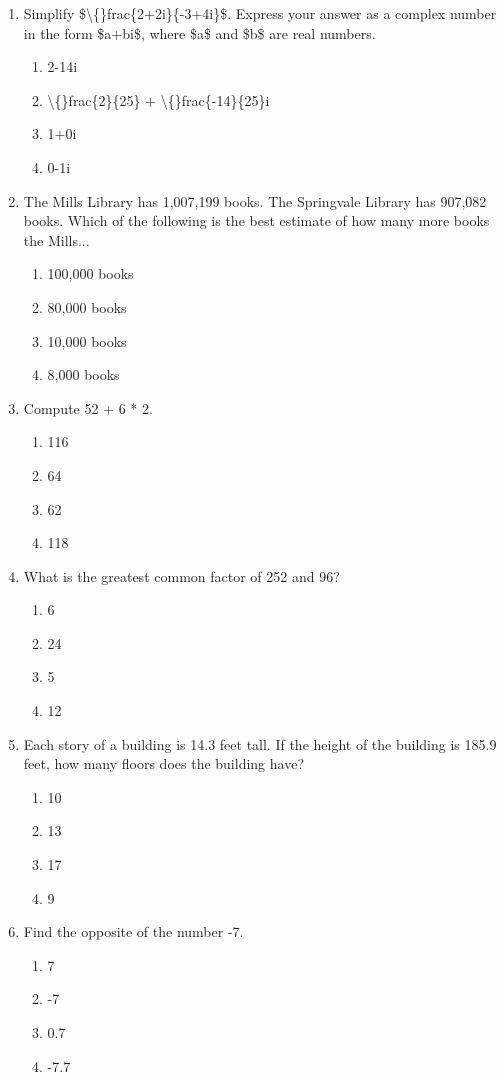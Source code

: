 \documentclass[12pt]{article}
\begin{document}
\begin{enumerate}[label=\arabic*.]
\begin{enumerate}[label=(\alph*)]
    \item 9 bottles of juice for \$20.25
    \item 16 bottles of juice for \$35.68
\end{enumerate}
\item Simplify \$\textbackslash\{\}frac\{2+2i\}\{-3+4i\}\$. Express your answer as a complex number in the form \$a+bi\$, where \$a\$ and \$b\$ are real numbers.
\begin{enumerate}[label=(\alph*)]
    \item 2-14i
    \item \textbackslash\{\}frac\{2\}\{25\} + \textbackslash\{\}frac\{-14\}\{25\}i
    \item 1+0i
    \item 0-1i
\end{enumerate}
\item The Mills Library has 1,007,199 books. The Springvale Library has 907,082 books. Which of the following is the best estimate of how many more books the Mills...
\begin{enumerate}[label=(\alph*)]
    \item 100,000 books
    \item 80,000 books
    \item 10,000 books
    \item 8,000 books
\end{enumerate}
\item Compute 52 + 6 * 2.
\begin{enumerate}[label=(\alph*)]
    \item 116
    \item 64
    \item 62
    \item 118
\end{enumerate}
\item What is the greatest common factor of 252 and 96?
\begin{enumerate}[label=(\alph*)]
    \item 6
    \item 24
    \item 5
    \item 12
\end{enumerate}
\item Each story of a building is 14.3 feet tall. If the height of the building is 185.9 feet, how many floors does the building have?
\begin{enumerate}[label=(\alph*)]
    \item 10
    \item 13
    \item 17
    \item 9
\end{enumerate}
\item Find the opposite of the number -7.
\begin{enumerate}[label=(\alph*)]
    \item 7
    \item -7
    \item 0.7
    \item -7.7
\end{enumerate}
\end{enumerate}
\end{document}
